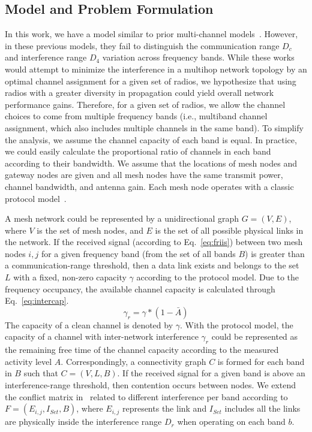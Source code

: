 \subsection{Model and Problem Formulation}
\label{subsec:problem}

In this work, we have a model similar to prior multi-channel models~\cite{tang2005interference,
doraghinejad2014channel,si2010overview}. However, in these previous models, 
they fail to distinguish the communication range $D_c$ and interference range
$D_4$ variation across frequency bands.  
While
these works would attempt to minimize the interference in a multihop network topology
by an optimal channel assignment for a given set of radios, we hypothesize that
using radios with a greater diversity in propagation could yield overall network 
performance gains.  
Therefore, for a given set of radios, we allow the channel
choices to come from multiple frequency bands (i.e., multiband channel 
assignment, which also includes multiple channels in the same band).
To simplify the analysis, we assume the channel capacity of each band is equal.
In practice, we could easily calculate the proportional ratio of channels in 
each band according to their bandwidth.
We assume that the locations of mesh nodes and gateway nodes are given and
all mesh nodes have the same transmit power, channel bandwidth, and antenna gain.
Each mesh node operates with a classic protocol model~\cite{gupta2000capacity}. 

A mesh network could be represented by a unidirectional graph $G=(V,E)$, where
$V$ is the set of mesh nodes, and $E$ is the set of all possible physical links 
in the network. If the received signal (according to Eq.~\ref{eq:friis}) between 
two mesh nodes $i,j$ for a given frequency band (from the set of all bands $B$) 
is greater than a communication-range threshold, then a data link exists and 
belongs to the set $L$ with a fixed, non-zero capacity $\gamma$ according to the protocol 
model.  
Due to the frequency occupancy, the available channel capacity is calculated 
through Eq.~\ref{eq:intercap}.
\begin{equation}
\label{eq:intercap}
\gamma_r=\gamma*(1-\bar{A})
\end{equation}
The capacity of a clean channel is denoted by $\gamma$. With the protocol model, the capacity 
of a channel with inter-network interference $\gamma_r$ could be represented as 
the remaining free time of the channel capacity according to the measured
activity level $A$.
Correspondingly, a connectivity graph $C$ is formed for each 
band in $B$ such that $C=(V,L,B)$.  If the received signal for a given band is 
above an interference-range threshold, then contention occurs between
nodes.  We extend the conflict matrix in~\cite{tang2005interference} related to
different interference per band according to $F=(E_{i,j},I_{Set},B)$, where $E_{i,j}$
represents the link and $I_{Set}$ includes all the links are physically inside 
the interference range $D_r$ when operating on each band $b$.

